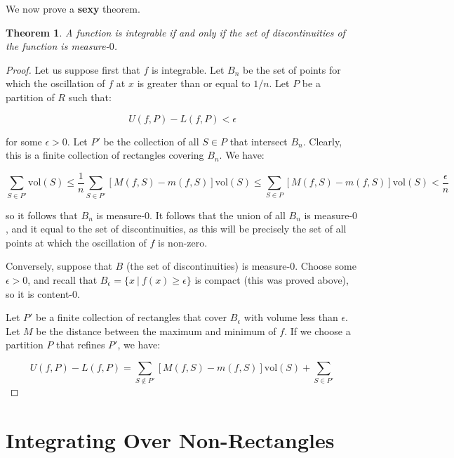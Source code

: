 \documentclass[10pt, oneside]{amsart}
\newtheorem{thm}{Theorem}
\begin{document}
    \hrulefill

    We now prove a \textbf{sexy} theorem.
    \newline

    \begin{thm}
      A function is integrable if and only if the set of discontinuities of the function is measure-$0$.
    \end{thm}

    \begin{proof}
      Let us suppose first that $f$ is integrable. Let $B_{n}$ be the set of points for which the oscillation of $f$ at $x$
      is greater than or equal to $1/n$. Let $P$ be a partition of $R$ such that:

      $$U(f, P) - L(f, P) < \epsilon$$

      for some $\epsilon > 0$. Let $P'$ be the collection of all $S \in P$ that intersect $B_{n}$. Clearly, this is a
      finite collection of rectangles covering $B_{n}$. We have:

      $$\displaystyle\sum_{S \in P'} \text{vol}(S) \leq \frac{1}{n} \displaystyle\sum_{S \in P'} [M(f, S) - m(f, S)] \text{vol}(S) \leq \displaystyle\sum_{S \in P} [M(f, S) - m(f, S)] \text{vol}(S) < \frac{\epsilon}{n}$$

      so it follows that $B_n$ is measure-$0$. It follows that the union of all $B_n$ is measure-$0$, and it equal to the set of discontinuities, as this will be precisely the set of all points at which the oscillation of $f$ is non-zero.
      \newline

      Conversely, suppose that $B$ (the set of discontinuities) is measure-$0$. Choose some $\epsilon > 0$, and recall that $B_{\epsilon} = \{x \ | \ f(x) \geq \epsilon\}$ is compact (this was proved above), so it is content-$0$.
      \newline

      Let $P'$ be a finite collection of rectangles that cover $B_{\epsilon}$ with volume less than $\epsilon$. Let $M$ be the distance between the maximum and minimum of $f$. If we choose a partition $P$ that refines $P'$, we have:

      $$U(f, P) - L(f, P) = \displaystyle\sum_{S \notin P'} [M(f, S) - m(f, S)] \text{vol}(S) + \displaystyle\sum_{S \in P'}$$
    \end{proof}

    \hrulefill

    \section{Integrating Over Non-Rectangles}
\end{document}
